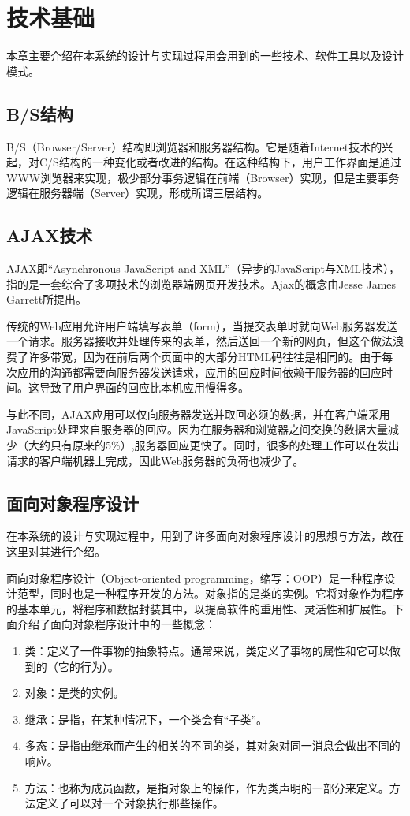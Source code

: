 
\chapter{技术基础}
本章主要介绍在本系统的设计与实现过程用会用到的一些技术、软件工具以及设计模式。
\section{B/S结构}

B/S（Browser/Server）结构即浏览器和服务器结构。它是随着Internet技术的兴起，对C/S结构的一种变化或者改进的结构。在这种结构下，用户工作界面是通过WWW浏览器来实现，极少部分事务逻辑在前端（Browser）实现，但是主要事务逻辑在服务器端（Server）实现，形成所谓三层结构。

\section{AJAX技术}

AJAX即“Asynchronous JavaScript and XML”（异步的JavaScript与XML技术），指的是一套综合了多项技术的浏览器端网页开发技术。Ajax的概念由Jesse James Garrett所提出。

传统的Web应用允许用户端填写表单（form），当提交表单时就向Web服务器发送一个请求。服务器接收并处理传来的表单，然后送回一个新的网页，但这个做法浪费了许多带宽，因为在前后两个页面中的大部分HTML码往往是相同的。由于每次应用的沟通都需要向服务器发送请求，应用的回应时间依赖于服务器的回应时间。这导致了用户界面的回应比本机应用慢得多。

与此不同，AJAX应用可以仅向服务器发送并取回必须的数据，并在客户端采用JavaScript处理来自服务器的回应。因为在服务器和浏览器之间交换的数据大量减少（大约只有原来的5\%）,服务器回应更快了。同时，很多的处理工作可以在发出请求的客户端机器上完成，因此Web服务器的负荷也减少了。


\section{面向对象程序设计}

在本系统的设计与实现过程中，用到了许多面向对象程序设计的思想与方法，故在这里对其进行介绍。

面向对象程序设计（Object-oriented programming，缩写：OOP）是一种程序设计范型，同时也是一种程序开发的方法。对象指的是类的实例。它将对象作为程序的基本单元，将程序和数据封装其中，以提高软件的重用性、灵活性和扩展性\cite{rentsch1982object}。下面介绍了面向对象程序设计中的一些概念：
\begin{enumerate}
\item 类：定义了一件事物的抽象特点。通常来说，类定义了事物的属性和它可以做到的（它的行为）。
\item 对象：是类的实例。
\item 继承：是指，在某种情况下，一个类会有“子类”。
\item 多态：是指由继承而产生的相关的不同的类，其对象对同一消息会做出不同的响应。
\item 方法：也称为成员函数，是指对象上的操作，作为类声明的一部分来定义。方法定义了可以对一个对象执行那些操作。
\end{enumerate}




